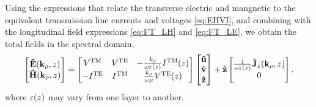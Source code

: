 \documentclass[12pt]{article}
\begin{document}
Using the expressions that relate the transverse electric and mangnetic to the equivalent transmission line currents and voltages \eqref{eq:EHVI}, and combining with the longitudinal field expressions \eqref{eq:FT_LH} and \eqref{eq:FT_LE}, we obtain the total fields in the spectral domain,
%
%
\begin{equation}
  \begin{bmatrix}
    \mathbf{\tilde{E}}(\mathbf{k}_{\rho},z) \\
    \mathbf{\tilde{H}}(\mathbf{k}_{\rho},z)
  \end{bmatrix}
  =
  \begin{bmatrix}
    V^{\mathrm{TM}} & V^{\mathrm{TE}} & -\frac{k_{\rho}}{\omega \varepsilon(z)}   I^{\mathrm{TM}}(z) \\
    -I^{\mathrm{TE}} & I^{\mathrm{TM}} & \frac{k_{\rho}}{\omega \mu}   V^{\mathrm{TE}}(z)
  \end{bmatrix}
  \begin{bmatrix}
    \mathbf{\hat u} \\
    \mathbf{\hat v} \\
    \mathbf{\hat z} \\
  \end{bmatrix} + \mathbf{\hat z}
  \begin{bmatrix}
    \frac{\mathrm{j}\mkern1mu}{\omega \varepsilon(z)}     \mathbf{\tilde{J}}_z(\mathbf{k}_{\rho},z) \\
    0
  \end{bmatrix}
  \label{eq:totalEHVI},
\end{equation}
%
where $\varepsilon(z)$ may vary from one layer to another.
\end{document}
